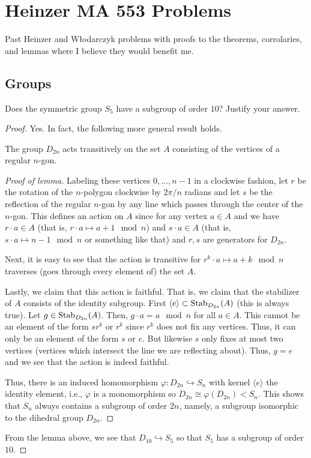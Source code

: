 \chapter{Heinzer MA 553 Problems}
Past Heinzer and Włodarczyk problems with proofs to the theorems,
corrolaries, and lemmas where I believe they would benefit me.
\section{Groups}
\begin{problem}
Does the symmetric group $S_5$ have a subgroup of order $10$? Justify your
answer.
\end{problem}
\begin{proof}
Yes. In fact, the following more general result holds.
\begin{lemma}
The group $D_{2n}$ acts transitively on the set $A$ consisting of the
vertices of a regular $n$-gon.
\end{lemma}
\begin{proof}[Proof of lemma]
\renewcommand\qedsymbol{$\clubsuit$}
Labeling these vertices $0,...,n-1$ in a clockwise fashion, let $r$ be the
rotation of the $n$-polygon clockwise by $2\pi/n$ radians and let $s$ be
the reflection of the regular $n$-gon by any line which passes through the
center of the $n$-gon. This defines an action on $A$ since for any vertex
$a\in A$ and we have $r\cdot a\in A$ (that is, $r\cdot a\mapsto a+1\mod n$)
and $s\cdot a\in A$ (that is, $s\cdot a\mapsto n-1\mod n$ or something like
that) and $r,s$ are generators for $D_{2n}$.

Next, it is easy to see that the action is transitive for $r^k\cdot
a\mapsto a+k\mod n$ traverses (goes through every element of) the set $A$.

Lastly, we claim that this action is faithful. That is, we claim that the
stabilizer of $A$ consists of the identity subgroup. First $\langle
e\rangle\subset\operatorname{Stab}_{D_{2n}}(A)$ (this is always true). Let
$g\in\operatorname{Stab}_{D_{2n}}(A)$. Then, $g\cdot a=a\mod n$ for all $a\in A$. This
cannot be an element of the form $sr^k$ or $r^k$ since $r^k$ does not fix
any vertices. Thus, it can only be an element of the form $s$ or $e$. But
likewise $s$ only fixes at most two vertices (vertices which intersect the
line we are reflecting about). Thus, $g=e$ and we see that the action is
indeed faithful.

Thus, there is an induced homomorphism $\varphi\colon D_{2n}\hookrightarrow
S_{n}$ with kernel $\langle e \rangle$ the identity element, i.e.,
$\varphi$ is a monomorphism so $D_{2n}\cong\varphi(D_{2n})<S_n$. This shows
that $S_n$ always contains a subgroup of order $2n$, namely, a subgroup
isomorphic to the dihedral group $D_{2n}$.
\end{proof}
From the lemma above, we see that $D_{10}\hookrightarrow S_5$ so that $S_5$
has a subgroup of order $10$.
\end{proof}

